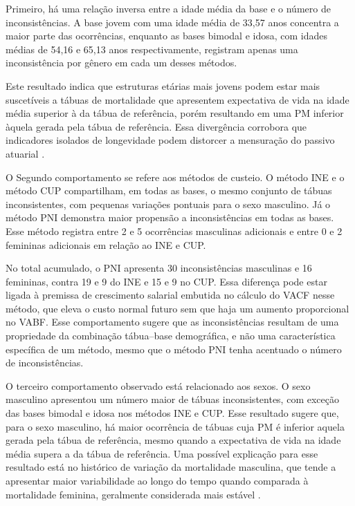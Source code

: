 Primeiro, há uma relação inversa entre a idade média da base e o número de inconsistências. A base jovem com uma idade média de 33,57 anos concentra a maior parte das ocorrências, enquanto as bases bimodal e idosa, com idades médias de 54,16 e 65,13 anos respectivamente, registram apenas uma inconsistência por gênero em cada um desses métodos. 

Este resultado indica que estruturas etárias mais jovens podem estar mais suscetíveis a tábuas de mortalidade que apresentem expectativa de vida na idade média superior à da tábua de referência, porém resultando em uma PM inferior àquela gerada pela tábua de referência. Essa divergência corrobora que indicadores isolados de longevidade podem distorcer a mensuração do passivo atuarial \cite{BERGERON2019,fong2015}.

O Segundo comportamento se refere aos métodos de custeio. O método INE e o método CUP compartilham, em todas as bases, o mesmo conjunto de tábuas inconsistentes, com pequenas variações pontuais para o sexo masculino. Já o método PNI demonstra maior propensão a inconsistências em todas as bases. Esse método registra entre 2 e 5 ocorrências masculinas adicionais e entre 0 e 2 femininas adicionais em relação ao INE e CUP.

No total acumulado, o PNI apresenta 30 inconsistências masculinas e 16 femininas, contra 19 e 9 do INE e 15 e 9 no CUP. Essa diferença pode estar ligada à premissa de crescimento salarial embutida no cálculo do VACF nesse método, que eleva o custo normal futuro sem que haja um aumento proporcional no VABF. Esse comportamento sugere que as inconsistências resultam de uma propriedade da combinação tábua–base demográfica, e não uma característica específica de um método, mesmo que o método PNI tenha acentuado o número de inconsistências.

O terceiro comportamento observado está relacionado aos sexos. O sexo masculino apresentou um número maior de tábuas inconsistentes, com exceção das bases bimodal e idosa nos métodos INE e CUP. Esse resultado sugere que, para o sexo masculino, há maior ocorrência de tábuas cuja PM é inferior aquela gerada pela tábua de referência, mesmo quando a expectativa de vida na idade média supera a da tábua de referência. Uma possível explicação para esse resultado está no histórico de variação da mortalidade masculina, que tende a apresentar maior variabilidade ao longo do tempo quando comparada à mortalidade feminina, geralmente considerada mais estável \cite{dif_genero2020}.

